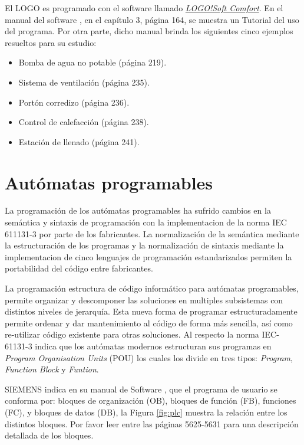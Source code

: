  El LOGO es programado con el software llamado \href{https://new.siemens.com/global/en/products/automation/systems/industrial/plc/logo/logo-software.html}{\textit{LOGO!Soft Comfort}}. En el manual del software \cite{LOGO2}, en el capítulo 3, página 164, se muestra un Tutorial del uso del programa. Por otra parte, dicho manual brinda los siguientes cinco ejemplos resueltos para su estudio:
 
\begin{itemize}
	\item Bomba de agua no potable (página 219).
	\item Sistema de ventilación (página 235).
	\item Portón corredizo (página 236).
	\item Control de calefacción (página 238).
	\item Estación de llenado (página 241).	
\end{itemize}
 
\section{Autómatas programables}

La programación de los autómatas programables ha sufrido cambios en la semántica y sintaxis de programación con la implementacion de la norma IEC 611131-3 \cite{IEC61131-1} por parte de los fabricantes. La normalización de la semántica  mediante la estructuración de los programas y la normalización de sintaxis mediante la implementacion de cinco lenguajes de programación estandarizados  permiten la portabilidad del código entre fabricantes. 

La programación  estructura de  código informático para autómatas programables, permite organizar y descomponer  las soluciones en multiples subsistemas con distintos niveles de jerarquía. Esta  nueva forma de programar estructuradamente permite ordenar y dar mantenimiento al código de forma más sencilla, así como re-utilizar  código existente para otras soluciones. Al respecto la norma IEC-61131-3 \cite{Tiegelkamp10} indica que los autómatas modernos estructuran sus programas en \textit{Program Organisation Units} (POU) los cuales los divide en tres tipos: \textit{Program}, \textit{Function Block} y \textit{Funtion}.  

SIEMENS indica en su manual de Software \cite{TIA-S7}, que el programa de usuario se conforma por: bloques  de organización (OB), bloques de función (FB), funciones (FC), y bloques de datos (DB), la Figura \ref{fig:plc} muestra la relación entre los distintos bloques. Por favor leer entre las páginas 5625-5631 para una descripción detallada de los bloques.


